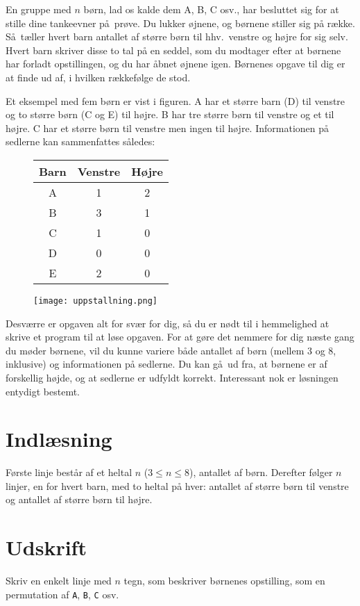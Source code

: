 En gruppe med $n$ børn, lad os kalde dem A, B, C osv., har besluttet sig for at stille dine tankeevner på prøve.
Du lukker øjnene, og børnene stiller sig på række.
Så tæller hvert barn antallet af større børn til hhv.\ venstre og højre for sig selv.
Hvert barn skriver disse to tal på en seddel, som du modtager efter at børnene har forladt opstillingen, og du har åbnet øjnene igen.
Børnenes opgave til dig er at finde ud af, i hvilken rækkefølge de stod.

Et eksempel med fem børn er vist i figuren.
A har et større barn (D) til venstre og to større børn (C og E) til højre.
B har tre større børn til venstre og et til højre.
C har et større børn til venstre men ingen til højre. 
Informationen på sedlerne kan sammenfattes således:

\begin{figure}[h!]
  \centering

\begin{minipage}{.5\textwidth}
    \begin{tabular}[b]{ccc}
      Barn&Venstre&Højre\\\hline
      A&1&2\\
      B&3&1\\
      C&1&0\\
      D&0&0\\
      E&2&0
    \end{tabular}
\end{minipage}%
\begin{minipage}{.5\textwidth}
    \texttt{[image: uppstallning.png]}
\end{minipage}
\end{figure}

Desværre er opgaven alt for svær for dig, så du er nødt til i hemmelighed at skrive et program til at løse opgaven.
For at gøre det nemmere for dig næste gang du møder børnene, vil du kunne variere både antallet af børn (mellem $3$ og $8$, inklusive) og informationen på sedlerne.
Du kan gå ud fra, at børnene er af forskellig højde, og at sedlerne er udfyldt korrekt.
Interessant nok er løsningen entydigt bestemt.

\section*{Indlæsning}
Første linje består af et heltal $n$ ($3 \le n \le 8$), antallet af børn.
Derefter følger $n$ linjer, en for hvert barn, med to heltal på hver: antallet af større børn til venstre og antallet af større børn til højre.

\section*{Udskrift}
Skriv en enkelt linje med $n$ tegn, som beskriver børnenes opstilling, som en permutation af \texttt{A}, \texttt{B}, \texttt{C} osv.
